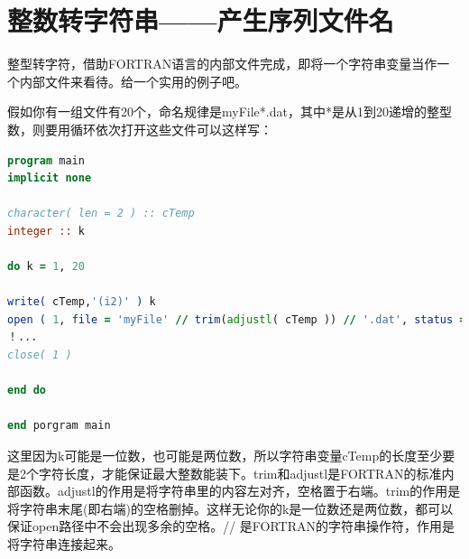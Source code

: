\section{整数转字符串——产生序列文件名}
整型转字符，借助FORTRAN语言的内部文件完成，即将一个字符串变量当作一个内部文件来看待。给一个实用的例子吧。

假如你有一组文件有20个，命名规律是myFile*.dat，其中*是从1到20递增的整型数，则要用循环依次打开这些文件可以这样写：
\begin{lstlisting}[language=Fortran]
program main
implicit none

character( len = 2 ) :: cTemp
integer :: k

do k = 1, 20

write( cTemp,'(i2)' ) k
open ( 1, file = 'myFile' // trim(adjustl( cTemp )) // '.dat', status = 'old' )
！...
close( 1 )

end do

end porgram main
\end{lstlisting}

这里因为k可能是一位数，也可能是两位数，所以字符串变量cTemp的长度至少要是2个字符长度，才能保证最大整数能装下。trim和adjustl是FORTRAN的标准内部函数。adjustl的作用是将字符串里的内容左对齐，空格置于右端。trim的作用是将字符串末尾(即右端)的空格删掉。这样无论你的k是一位数还是两位数，都可以保证open路径中不会出现多余的空格。// 是FORTRAN的字符串操作符，作用是将字符串连接起来。

